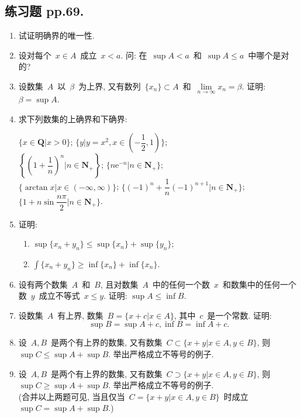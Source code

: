\documentclass[UTF8,a4paper,11pt,twoside]{book}
\newcommand{\e}{\mathrm e}
\begin{document}
\subsection{练习题 pp.69.}
\begin{enumerate}
	\item 试证明确界的唯一性.

	\item 设对每个~$x\in A$~成立~$x<a$. 问: 在~$\sup{A}<a$~和~$\sup{A}\leqslant a$~中哪个是对的?

	\item 设数集~$A$~以~$\beta$~为上界, 又有数列~$\{x_n\}\subset A$~和~$\lim\limits_{n\to\infty} x_n=\beta$. 证明: $\beta=\sup{A}$.

	\item 求下列数集的上确界和下确界:
	      \begin{tabenum}[(1)]
		      \tabenumitem $\{x\in\mathbf{Q}|x>0\}$;
		      \tabenumitem $\{y|y=x^2,x\in(-\dfrac{1}{2},1)\}$;\\
		      \tabenumitem $\left\{\left(1+\dfrac{1}{n}\right)^n | n\in\mathbf{N}_{+}\right\}$;
		      \tabenumitem $\{n\e^{-n}|n\in\mathbf{N}_{+}\}$;\\
		      \tabenumitem $\{\arctan{x}|x\in(-\infty,\infty)\}$;
		      \tabenumitem $\{(-1)^n+\dfrac{1}{n}(-1)^{n+1}|n\in\mathbf{N}_{+}\}$;\\
		      \tabenumitem $\{1+n\sin{\dfrac{n\pi}{2}}|n\in\mathbf{N}_{+}\}$.
	      \end{tabenum}

	\item 证明:
	      \begin{enumerate}[(1)]
		      \item $\sup\{x_n+y_n\}\leqslant\sup\{x_n\}+\sup\{y_n\}$;
		      \item $\int\{x_n+y_n\}\geqslant\inf\{x_n\}+\inf\{x_n\}$.
	      \end{enumerate}

	\item 设有两个数集~$A$~和~$B$, 且对数集~$A$~中的任何一个数~$x$~和数集中的任何一个数~$y$~成立不等式~$x\leqslant y$. 证明: $\sup{A}\leqslant\inf{B}$.

	\item 设数集~$A$~有上界, 数集~$B=\{x+c|x\in A\}$, 其中~$c$~是一个常数. 证明:
	      \[
		      \sup{B}=\sup{A}+c, \inf{B}=\inf{A}+c.
	      \]

	\item 设~$A,B$~是两个有上界的数集, 又有数集~$C\subset\{x+y|x\in A, y\in B\}$, 则~$\sup{C}\leqslant\sup{A}+\sup{B}$. 举出严格成立不等号的例子.

	\item 设~$A,B$~是两个有上界的数集, 又有数集~$C\supset\{x+y|x\in A, y\in B\}$, 则~$\sup{C}\geqslant\sup{A}+\sup{B}$. 举出严格成立不等号的例子.\\

	      (合并以上两题可见, 当且仅当~$C=\{x+y|x\in A, y\in B\}$~时成立~$\sup{C}=\sup{A}+\sup{B}$.)
\end{enumerate}
\end{document}
